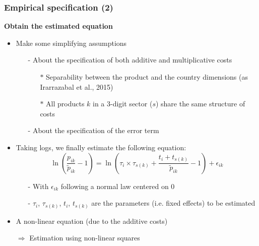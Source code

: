 \documentclass[10 pt,Helvetica, french]{beamer}
\begin{document}
\begin{frame}[label = slide_empirical_strategy]
\frametitle{Empirical specification (2)}
\textbf{Obtain the estimated equation}
\begin{itemize}
\item Make some simplifying assumptions \hyperlink{app_empirical_strategy}{}  \vspace{0.1cm}
\begin{itemize}
\item[-] About the specification of both additive and multiplicative costs  \vspace{0.1cm}
\begin{itemize}
\item[$\ast$] Separability between the product and the country dimensions (as Irarrazabal et al., 2015)   \vspace{0.1cm}
\item[$\ast$] All products $k$ in a 3-digit sector ($s$) share the same structure of costs  \vspace{0.1cm}
\end{itemize}
\item[-] About the specification of the error term \vspace{0.1cm}
\end{itemize}
\item Taking logs, we finally estimate the following equation:
\footnotesize
\begin{equation*}
\ln\left(\frac{p_{ik}}{\widetilde{p}_{ik}}-1 \right)= \ln \left(\tau_{i} \times \tau_{s(k)}+\frac{t_{i} + t_{s(k)}}{\widetilde{p}_{ik}}-1 \right) + \epsilon_{ik}
\end{equation*}

\begin{itemize}
\footnotesize
\item[-] With $\epsilon_{ik}$ following a normal law centered on 0  \vspace{0.1cm}
\item[-] $\tau_i$, $\tau_{s(k)}$, $t_i$, $t_{s(k)}$ are the parameters (i.e. fixed effects) to be estimated
\end{itemize}
\normalsize
\item A non-linear equation (due to the additive costs)  
\item[$\Rightarrow$] Estimation using non-linear squares 
\end{itemize}
\end{frame}
\end{document}
